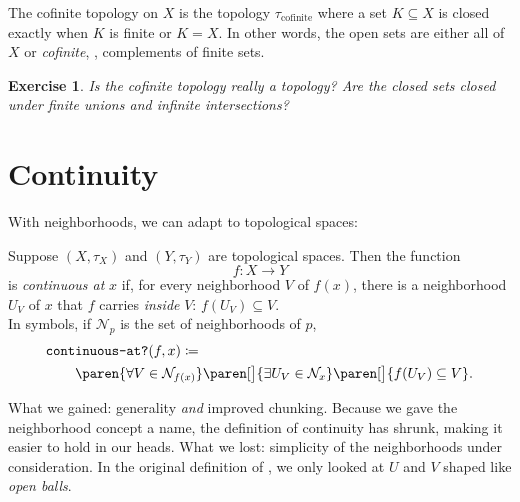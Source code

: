\documentclass[a5paper]{scrbook}
\newcounter{exercisectr}
\newtheorem{exercise}[exercisectr]{Exercise}
\def\nhood{{\mathcal N}}
\begin{document}
  \begin{defn}
    The cofinite topology on \(X\) is the topology \(\tau_{\text{cofinite}}\) where a set \(K\subseteq X\) is closed exactly when \(K\) is finite or \(K=X\). In other words, the open sets are either all of \(X\) or \emph{cofinite}, \ie, complements of finite sets. 
  \end{defn}
  \begin{exercise}
    Is the cofinite topology really a topology? Are the closed sets closed under finite unions and infinite intersections?
  \end{exercise}
  \section{Continuity}
  With neighborhoods, we can adapt  to topological spaces:
  \begin{defn}
    Suppose \((X,\tau_X)\) and \((Y,\tau_Y)\) are topological spaces. Then the function
    \[
      f:X\to Y
    \]
    is \emph{continuous at} \(x\) if, for every neighborhood \(V\) of \(f(x)\), there is a neighborhood \(U_V\) of \(x\) that \(f\) carries \emph{inside} \(V\):
    \(
       f(U_V) \subseteq V. 
    \)
    \[
      
    \]
    In symbols, if \(\nhood_p\) is the set of neighborhoods of \(p\), 
    \begin{align*}
      \texttt{cont}&\texttt{inuous-at?}(f,x)\define\\
                   &\paren{\forall V\in \nhood_{f(x)}}\paren[\big]{\exists U_V \in\nhood_{x}}\paren[\big]{f(U_V)\subseteq V}.
    \end{align*}
  \end{defn}
  What we gained: generality \emph{and} improved chunking. Because we gave the neighborhood concept a name, the definition of continuity has shrunk, making it easier to hold in our heads. What we lost: simplicity of the neighborhoods under consideration. In the original definition of , we only looked at \(U\) and \(V\) shaped like \emph{open balls}.
\end{document}
